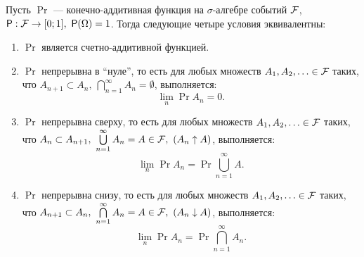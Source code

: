 \begin{theorem}
	Пусть $ \Pr $ --- конечно-аддитивная функция на $ \sigma $-алгебре событий $ \mathcal{F} $, \(\Pr: \F \to [0; 1],\ \Pr(\Omega) = 1 \). Тогда следующие четыре условия эквивалентны:
	\begin{enumerate}[label = (\alph*)]
		\item $ \Pr $ является счетно-аддитивной функцией.
		
		\item $ \Pr $ непрерывна в ``нуле'', то есть для любых множеств \(A_1, A_2, \ldots \in \mathcal{F} \) таких, что \(A_{n + 1} \subset A_n,\ \bigcap\limits_{n = 1}^{\infty}A_n = \emptyset \), выполняется:
		\[
		\lim\limits_{n}\Pr{A_n} = 0.
		\]  
		
		\item $ \Pr $ непрерывна сверху, то есть для любых множеств \(A_1, A_2, \ldots \in \mathcal{F} \) таких, что \(A_{n} \subset A_{n + 1},\ \bigcup\limits_{n = 1}^{\infty}A_n = A \in \mathcal{F},\  (A_n \uparrow A) \), выполняется:
		\[
		\lim\limits_{n}\Pr{A_n} = \Pr{\bigcup\limits_{n = 1}^{\infty}A}.
		\]  
		
		\item $ \Pr $ непрерывна снизу, то есть для любых множеств \(A_1, A_2, \ldots \in \mathcal{F} \) таких, что \(A_{n + 1} \subset A_{n},\ \bigcap\limits_{n = 1}^{\infty}A_n = A \in \mathcal{F},\  (A_n \downarrow A) \), выполняется:
		\[
		\lim\limits_{n}\Pr{A_n} = \Pr{\bigcap\limits_{n = 1}^{\infty}A_n}.
		\]  
		
	\end{enumerate}
\end{theorem}
